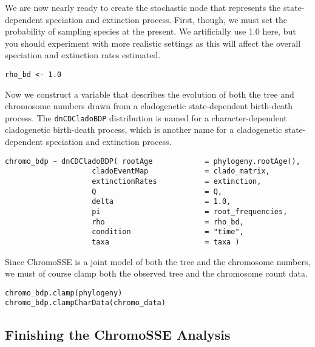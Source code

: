 We are now nearly ready to create the stochastic node that represents
the state-dependent speciation and extinction process.
First, though, we must set the probability of sampling species at the present.
We artificially use 1.0 here, but you should experiment with more realistic settings
as this will affect the overall speciation and extinction rates estimated.
{\tt \begin{snugshade*}
\begin{lstlisting}
rho_bd <- 1.0
\end{lstlisting}
\end{snugshade*}
}
Now we construct a variable that describes the evolution of both the tree and chromosome
numbers drawn from a cladogenetic state-dependent birth-death process.
The \texttt{dnCDCladoBDP} distribution is named for a
character-dependent cladogenetic birth-death process, which is
another name for a cladogenetic state-dependent speciation and extinction process.
{\tt \begin{snugshade*}
\begin{lstlisting}
chromo_bdp ~ dnCDCladoBDP( rootAge            = phylogeny.rootAge(),
                    cladoEventMap             = clado_matrix,
                    extinctionRates           = extinction,
                    Q                         = Q,
                    delta                     = 1.0,
                    pi                        = root_frequencies,
                    rho                       = rho_bd,
                    condition                 = "time",
                    taxa                      = taxa )
\end{lstlisting}
\end{snugshade*}
}
Since ChromoSSE is a joint model of both the tree and the chromosome numbers,
we must of course clamp both the observed tree and the chromosome count data.
{\tt \begin{snugshade*}
\begin{lstlisting}
chromo_bdp.clamp(phylogeny)
chromo_bdp.clampCharData(chromo_data)
\end{lstlisting}
\end{snugshade*}
}

\medskip 
\subsection{Finishing the ChromoSSE Analysis}

